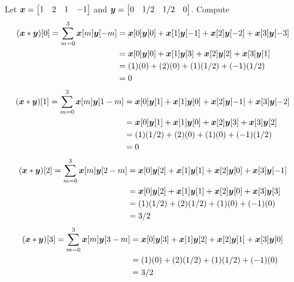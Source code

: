 \begin{example}
Let $\boldsymbol{x} = \begin{bmatrix} 1 & 2 & 1 & -1 \end{bmatrix}$ and $\boldsymbol{y} = \begin{bmatrix} 0 & 1/2 & 1/2 & 0 \end{bmatrix}$. Compute
\begin{align*}
( \boldsymbol{x} * \boldsymbol{y} )[0] = \sum_{m=0}^3 \boldsymbol{x}[m] \boldsymbol{y}[- m] &= \boldsymbol{x}[0] \boldsymbol{y}[0] + \boldsymbol{x}[1] \boldsymbol{y}[-1] + \boldsymbol{x}[2] \boldsymbol{y}[-2] + \boldsymbol{x}[3] \boldsymbol{y}[-3] \\
&= \boldsymbol{x}[0] \boldsymbol{y}[0] + \boldsymbol{x}[1] \boldsymbol{y}[3] + \boldsymbol{x}[2] \boldsymbol{y}[2] + \boldsymbol{x}[3] \boldsymbol{y}[1] \\
&= (1)(0) + (2)(0) + (1)(1/2) + (-1)(1/2) \\
&= 0
\end{align*}
\begin{align*}
( \boldsymbol{x} * \boldsymbol{y} )[1] = \sum_{m=0}^3 \boldsymbol{x}[m] \boldsymbol{y}[1 - m] &= \boldsymbol{x}[0] \boldsymbol{y}[1] + \boldsymbol{x}[1] \boldsymbol{y}[0] + \boldsymbol{x}[2] \boldsymbol{y}[-1] + \boldsymbol{x}[3] \boldsymbol{y}[-2] \\
&= \boldsymbol{x}[0] \boldsymbol{y}[1] + \boldsymbol{x}[1] \boldsymbol{y}[0] + \boldsymbol{x}[2] \boldsymbol{y}[3] + \boldsymbol{x}[3] \boldsymbol{y}[2] \\
&= (1)(1/2) + (2)(0) + (1)(0) + (-1)(1/2) \\
&= 0
\end{align*}
\begin{align*}
( \boldsymbol{x} * \boldsymbol{y} )[2] = \sum_{m=0}^3 \boldsymbol{x}[m] \boldsymbol{y}[2 - m] &= \boldsymbol{x}[0] \boldsymbol{y}[2] + \boldsymbol{x}[1] \boldsymbol{y}[1] + \boldsymbol{x}[2] \boldsymbol{y}[0] + \boldsymbol{x}[3] \boldsymbol{y}[-1] \\
&= \boldsymbol{x}[0] \boldsymbol{y}[2] + \boldsymbol{x}[1] \boldsymbol{y}[1] + \boldsymbol{x}[2] \boldsymbol{y}[0] + \boldsymbol{x}[3] \boldsymbol{y}[3] \\
&= (1)(1/2) + (2)(1/2) + (1)(0) + (-1)(0) \\
&= 3/2
\end{align*}
\begin{align*}
( \boldsymbol{x} * \boldsymbol{y} )[3] = \sum_{m=0}^3 \boldsymbol{x}[m] \boldsymbol{y}[3 - m] &= \boldsymbol{x}[0] \boldsymbol{y}[3] + \boldsymbol{x}[1] \boldsymbol{y}[2] + \boldsymbol{x}[2] \boldsymbol{y}[1] + \boldsymbol{x}[3] \boldsymbol{y}[0] \\
&= (1)(0) + (2)(1/2) + (1)(1/2) + (-1)(0) \\
&= 3/2
\end{align*}
\end{example}

